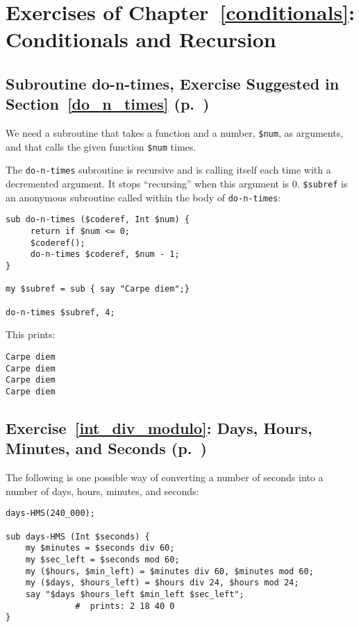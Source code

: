 \section{Exercises of Chapter~\ref{conditionals}: Conditionals and Recursion}

\label{sol_do_n_times}

\subsection{Subroutine do-n-times, Exercise Suggested in Section~\ref{do_n_times} (p.~\pageref{do_n_times})}

We need a subroutine that takes a function 
and a number, {\tt \$num}, as arguments, and that calls
the given function {\tt \$num} times.

The {\tt do-n-times} subroutine is recursive and is 
calling itself each time with a decremented argument. It 
stops ``recursing'' when this argument is 0. \verb'$subref' is an anonymous subroutine called within the body of 
{\tt do-n-times}:

\begin{verbatim}
sub do-n-times ($coderef, Int $num) {
     return if $num <= 0;
     $coderef();
     do-n-times $coderef, $num - 1;
}

my $subref = sub { say "Carpe diem";}

do-n-times $subref, 4;
\end{verbatim}

This prints:

\begin{verbatim}
Carpe diem
Carpe diem
Carpe diem
Carpe diem
\end{verbatim}

\subsection{Exercise~\ref{int_div_modulo}: Days, Hours, 
Minutes, and Seconds (p.~\pageref{int_div_modulo})}
\label{sol_int_div_modulo}

The following is one possible way of converting a number 
of seconds into a number of days, hours, minutes, and seconds:


\begin{verbatim}
days-HMS(240_000);

sub days-HMS (Int $seconds) {
    my $minutes = $seconds div 60;
    my $sec_left = $seconds mod 60;
    my ($hours, $min_left) = $minutes div 60, $minutes mod 60;
    my ($days, $hours_left) = $hours div 24, $hours mod 24;
    say "$days $hours_left $min_left $sec_left"; 
              #  prints: 2 18 40 0
}
\end{verbatim}

